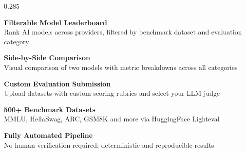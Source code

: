 \documentclass[final]{beamer}
\begin{document}
\begin{frame}[t]
\begin{columns}[T,totalwidth=\linewidth]
\begin{column}{0.285\linewidth}
  \begin{tcolorbox}[sectionbox,title={Key Features}]

    \begin{tcolorbox}[featureft]
      {\fontsize{17}{21}\selectfont
      \textcolor{evalgreenLight}{\textbf{Filterable Model Leaderboard}}\\[0.1cm]
      \color{white}Rank AI models across providers, filtered by benchmark dataset and evaluation category
      }
    \end{tcolorbox}
    \vspace{0.25cm}

    \begin{tcolorbox}[featureft]
      {\fontsize{17}{21}\selectfont
      \textcolor{evalgreenLight}{\textbf{Side-by-Side Comparison}}\\[0.1cm]
      \color{white}Visual comparison of two models with metric breakdowns across all categories
      }
    \end{tcolorbox}
    \vspace{0.25cm}

    \begin{tcolorbox}[featureft]
      {\fontsize{17}{21}\selectfont
      \textcolor{evalgreenLight}{\textbf{Custom Evaluation Submission}}\\[0.1cm]
      \color{white}Upload datasets with custom scoring rubrics and select your LLM judge
      }
    \end{tcolorbox}
    \vspace{0.25cm}

    \begin{tcolorbox}[featureft]
      {\fontsize{17}{21}\selectfont
      \textcolor{evalgreenLight}{\textbf{500+ Benchmark Datasets}}\\[0.1cm]
      \color{white}MMLU, HellaSwag, ARC, GSM8K and more via HuggingFace Lighteval
      }
    \end{tcolorbox}
    \vspace{0.25cm}

    \begin{tcolorbox}[featureft]
      {\fontsize{17}{21}\selectfont
      \textcolor{evalgreenLight}{\textbf{Fully Automated Pipeline}}\\[0.1cm]
      \color{white}No human verification required; deterministic and reproducible results
      }
    \end{tcolorbox}
    \vspace{0.25cm}


\end{tcolorbox}
\end{column}
\end{columns}
\end{frame}
\end{document}
